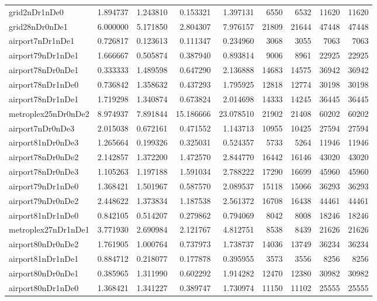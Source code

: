 \begin{longtable}{|l|r|r|r|r|r|r|r|r|}
grid2nDr1nDe0 & 1.894737 & 1.243810 & 0.153321 & 1.397131 & 6550 & 6532 & 11620 & 11620 \\
grid28nDr0nDe1 & 6.000000 & 5.171850 & 2.804307 & 7.976157 & 21809 & 21644 & 47448 & 47448 \\
airport7nDr1nDe1 & 0.726817 & 0.123613 & 0.111347 & 0.234960 & 3068 & 3055 & 7063 & 7063 \\
airport79nDr1nDe1 & 1.666667 & 0.505874 & 0.387940 & 0.893814 & 9006 & 8961 & 22925 & 22925 \\
airport78nDr0nDe1 & 0.333333 & 1.489598 & 0.647290 & 2.136888 & 14683 & 14575 & 36942 & 36942 \\
airport78nDr1nDe0 & 0.736842 & 1.358632 & 0.437293 & 1.795925 & 12818 & 12774 & 30198 & 30198 \\
airport78nDr1nDe1 & 1.719298 & 1.340874 & 0.673824 & 2.014698 & 14333 & 14245 & 36445 & 36445 \\
metroplex25nDr0nDe2 & 8.974937 & 7.891844 & 15.186666 & 23.078510 & 21902 & 21408 & 60202 & 60202 \\
airport7nDr0nDe3 & 2.015038 & 0.672161 & 0.471552 & 1.143713 & 10955 & 10425 & 27594 & 27594 \\
airport81nDr0nDe3 & 1.265664 & 0.199326 & 0.325031 & 0.524357 & 5733 & 5264 & 11946 & 11946 \\
airport78nDr0nDe2 & 2.142857 & 1.372200 & 1.472570 & 2.844770 & 16442 & 16146 & 43020 & 43020 \\
airport78nDr0nDe3 & 1.105263 & 1.197188 & 1.591034 & 2.788222 & 17290 & 16699 & 45960 & 45960 \\
airport79nDr1nDe0 & 1.368421 & 1.501967 & 0.587570 & 2.089537 & 15118 & 15066 & 36293 & 36293 \\
airport79nDr0nDe2 & 2.448622 & 1.373834 & 1.187538 & 2.561372 & 16708 & 16438 & 44461 & 44461 \\
airport81nDr1nDe0 & 0.842105 & 0.514207 & 0.279862 & 0.794069 & 8042 & 8008 & 18246 & 18246 \\
metroplex27nDr1nDe1 & 3.771930 & 2.690984 & 2.121767 & 4.812751 & 8538 & 8439 & 21626 & 21626 \\
airport80nDr0nDe2 & 1.761905 & 1.000764 & 0.737973 & 1.738737 & 14036 & 13749 & 36234 & 36234 \\
airport81nDr1nDe1 & 0.884712 & 0.218077 & 0.177878 & 0.395955 & 3573 & 3556 & 8256 & 8256 \\
airport80nDr0nDe1 & 0.385965 & 1.311990 & 0.602292 & 1.914282 & 12470 & 12380 & 30982 & 30982 \\
airport80nDr1nDe0 & 1.368421 & 1.341227 & 0.389747 & 1.730974 & 11150 & 11102 & 25555 & 25555 \\

\end{longtable}
